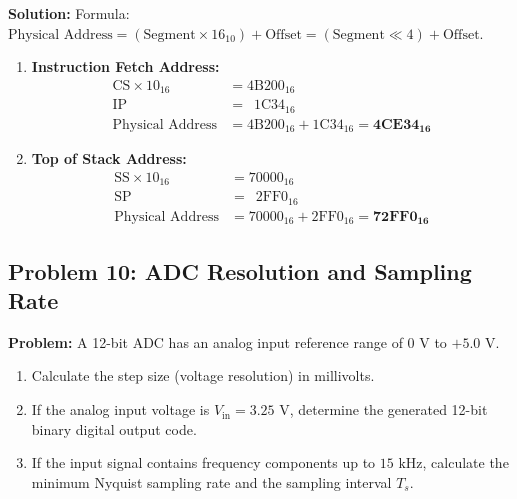 \textbf{Solution:}
Formula: $\text{Physical Address} = (\text{Segment} \times 16_{10}) + \text{Offset} = (\text{Segment} \ll 4) + \text{Offset}$.
\begin{enumerate}[label=\bfseries\alph*.]
    \item \textbf{Instruction Fetch Address:}
    \begin{align*}
    \text{CS} \times 10_{16} &= 4\text{B}200_{16} \\
    \text{IP} &= \phantom{0}1\text{C}34_{16} \\
    \text{Physical Address} &= 4\text{B}200_{16} + 1\text{C}34_{16} = \mathbf{4\text{CE}34_{16}}
    \end{align*}
    \item \textbf{Top of Stack Address:}
    \begin{align*}
    \text{SS} \times 10_{16} &= 70000_{16} \\
    \text{SP} &= \phantom{0}2\text{FF}0_{16} \\
    \text{Physical Address} &= 70000_{16} + 2\text{FF}0_{16} = \mathbf{72\text{FF}0_{16}}
    \end{align*}
\end{enumerate}

\subsection{Problem 10: ADC Resolution and Sampling Rate}
\textbf{Problem:} A 12-bit ADC has an analog input reference range of $0\text{ V}$ to $+5.0\text{ V}$.
\begin{enumerate}[label=\bfseries\alph*.]
    \item Calculate the step size (voltage resolution) in millivolts.
    \item If the analog input voltage is $V_{\text{in}} = 3.25\text{ V}$, determine the generated 12-bit binary digital output code.
    \item If the input signal contains frequency components up to $15\text{ kHz}$, calculate the minimum Nyquist sampling rate and the sampling interval $T_s$.
\end{enumerate}

